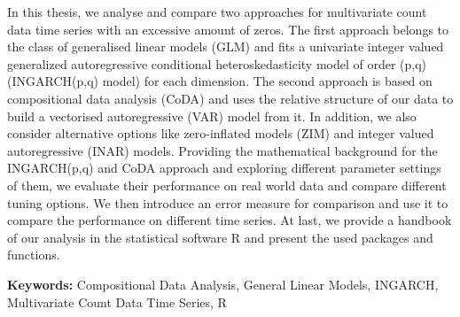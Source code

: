 In this thesis, we analyse and compare two approaches for multivariate count data time series with an excessive amount of zeros. The first approach belongs to the class of generalised linear models (GLM) and fits a univariate integer valued generalized autoregressive conditional heteroskedasticity model of order (p,q) (INGARCH(p,q) model) for each dimension. The second approach is based on compositional data analysis (CoDA) and uses the relative structure of our data to build a vectorised autoregressive (VAR) model from it. In addition, we also consider alternative options like zero-inflated models (ZIM) and integer valued autoregressive (INAR) models. Providing the mathematical background for the INGARCH(p,q) and CoDA approach and exploring different parameter settings of them, we evaluate their performance on real world data and compare different tuning options. We then introduce an error measure for comparison and use it to compare the performance on different time series. At last, we provide a handbook of our analysis in the statistical software R and present the used packages and functions. \newline

\textbf{Keywords:} Compositional Data Analysis, General Linear Models, INGARCH, Multivariate Count Data Time Series, R